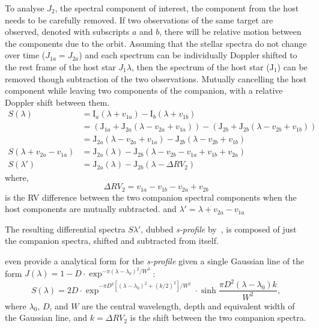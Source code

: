 To analyse \(J_2\), the spectral component of interest, the component from the host needs to be carefully removed. If two observations of the same target are observed, denoted with subscripts \(a\) and \(b\), there will be relative motion between the components due to the orbit. Assuming that the stellar spectra do not change over time (\(J_{1a} = J_{2a}\)) and each spectrum can be individually Doppler shifted to the rest frame of the host star \(J_1{\lambda}\), then the spectrum of the host star (\(\textrm{J}_{1}\)) can be removed though subtraction of the two observations. Mutually cancelling the host component while leaving two components of the companion, with a relative Doppler shift between them.
\begin{align}
S(\lambda) &= \textrm{I}_{a}(\lambda + v_{1a}) - \textrm{I}_{b}(\lambda + v_{1b}) \nonumber \\
&= (\textrm{J}_{1a} + \textrm{J}_{2a}(\lambda - v_{2a} + v_{1a})) - (\textrm{J}_{2b} +\textrm{J}_{2b}(\lambda - v_{2b} + v_{1b})) \nonumber \\
&= \textrm{J}_{2a}(\lambda - v_{2a} + v_{1a}) - \textrm{J}_{2b}(\lambda - v_{2b} + v_{1b}) \nonumber \\
S(\lambda + v_{2a}-v_{1a}) &= \textrm{J}_{2a}(\lambda) - \textrm{J}_{2b}(\lambda - v_{2b} - v_{1a} + v_{1b} + v_{2a})\\
S(\lambda') &= \textrm{J}_{2a}(\lambda) - \textrm{J}_{2b}(\lambda - \Delta {RV}_2) \label{eqn:sprofile}
\end{align}
where,
\begin{equation}
\Delta {RV}_2 = v_{1a} - v_{1b} - v_{2a} + v_{2b} \label{eqn:companion_difference}
\end{equation}
is the {RV} difference between the two companion spectral components when the host components are mutually subtracted.
and \(\lambda' = \lambda + v_{2a}-v_{1a}\)

The resulting differential spectra \(S{\lambda'}\), dubbed \emph{s-profile} by~\citet{ferluga_separating_1997}, is composed of just the companion spectra, shifted and subtracted from itself.

\cite{ferluga_separating_1997} even provide a analytical form for the \emph{s-profile} given a single Gaussian line of the form
$J(\lambda) = 1- D \cdot\exp^{{-\pi {(\lambda - \lambda_0)}^2} / {{W}^{2}}}$:
\begin{equation}
    S(\lambda) = 2 D\cdot\exp^{{-\pi {D}^{2} [{(\lambda - \lambda_0)}^{2} +{(k/2)}^{2}]}/{{W}^{2}}} \cdot \sinh{\frac{\pi {D}^{2}(\lambda-\lambda_0)k}{{W}^{2}}},\label{eqn:sprofile_gaussain}
\end{equation}
where $\lambda_0$, $D$, and $W$ are the central wavelength, depth and equivalent width of the Gaussian line, and $k=\Delta {RV}_2 $ is the shift between the two companion spectra.


